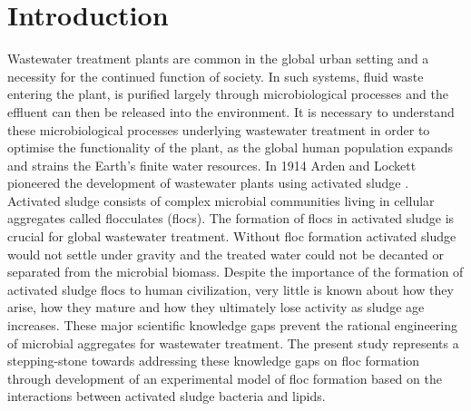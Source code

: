 \documentclass[twoside]{article}
\begin{document}
\newpage
\setcounter{page}{1}
\section{Introduction}
\thispagestyle{plain}
Wastewater treatment plants are common in the global urban setting and a necessity for the continued function of society. In such systems, fluid waste entering the plant, is purified largely through microbiological processes and the effluent can then be released into the environment. It is necessary to understand these microbiological processes underlying wastewater treatment in order to optimise the functionality of the plant, as the global human population expands and strains the Earth's finite water resources. In 1914 Arden and Lockett pioneered the development of wastewater plants using activated sludge \cite{ardern1914experiments}.\\

Activated sludge consists of complex microbial communities living in cellular aggregates called flocculates (flocs). The formation of flocs in activated sludge is crucial for global wastewater treatment. Without floc formation activated sludge would not settle under gravity and the treated water could not be decanted or separated from the microbial biomass. Despite the importance of the formation of activated sludge flocs to human civilization, very little is known about how they arise, how they mature and how they ultimately lose activity as sludge age increases. These major scientific knowledge gaps prevent the rational engineering of microbial aggregates for wastewater treatment. The present study represents a stepping-stone towards addressing these knowledge gaps on floc formation through development of an experimental model of floc formation based on the interactions between activated sludge bacteria and lipids. \\

\end{document}
